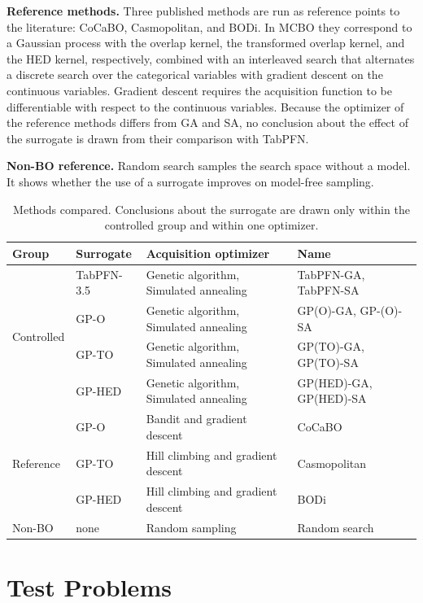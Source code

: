 \textbf{Reference methods.} Three published methods are run as reference points to the literature: CoCaBO, Casmopolitan, and BODi. In MCBO they correspond to a Gaussian process with the overlap kernel, the transformed overlap kernel, and the HED kernel, respectively, combined with an interleaved search that alternates a discrete search over the categorical variables with gradient descent on the continuous variables. Gradient descent requires the acquisition function to be differentiable with respect to the continuous variables. Because the optimizer of the reference methods differs from GA and SA, no conclusion about the effect of the surrogate is drawn from their comparison with TabPFN.

\textbf{Non-BO reference.} Random search samples the search space without a model. It shows whether the use of a surrogate improves on model-free sampling.

\begin{table}[htbp]
  \centering
  \caption{Methods compared. Conclusions about the surrogate are drawn only within the controlled group and within one optimizer.}
  \label{tab:methods}
  \begin{tabular}{llll}
    \toprule
    Group & Surrogate & Acquisition optimizer & Name \\
    \midrule
    \multirow{4}{*}{Controlled}
      & TabPFN-3.5 & Genetic algorithm, Simulated annealing & TabPFN-GA, TabPFN-SA \\
      & GP-O       & Genetic algorithm, Simulated annealing & GP(O)-GA, GP-(O)-SA     \\
      & GP-TO      & Genetic algorithm, Simulated annealing & GP(TO)-GA, GP(TO)-SA   \\
      & GP-HED     & Genetic algorithm, Simulated annealing & GP(HED)-GA, GP(HED)-SA \\
    \midrule
    \multirow{3}{*}{Reference}
      & GP-O       & Bandit and gradient descent       & CoCaBO               \\
      & GP-TO      & Hill climbing and gradient descent & Casmopolitan         \\
      & GP-HED     & Hill climbing and gradient descent & BODi                 \\
    \midrule
    Non-BO & none & Random sampling                   & Random search        \\
    \bottomrule
  \end{tabular}
\end{table}

\section{Test Problems}

